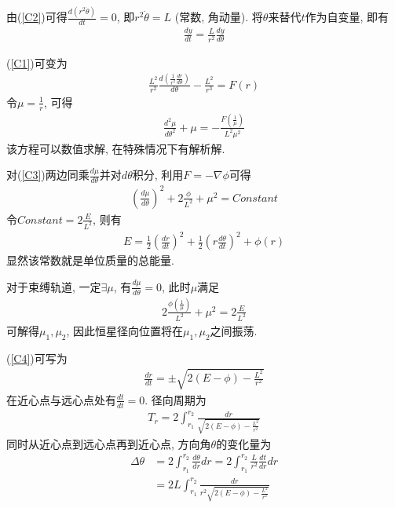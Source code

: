由(\ref{C2})可得$\displaystyle \frac{d(r^2\dot{\theta})}{dt}=0$, 即$r^2\dot{\theta}=L$ (常数, 角动量). 将$\theta$来替代$t$作为自变量, 即有
\begin{align*}
    \frac{dy}{dt}=\frac{L}{r^2}\frac{dy}{d\theta}
\end{align*}

(\ref{C1})可变为
\begin{align*}
    \frac{L^2}{r^2}\frac{d\left( \frac{1}{r^2}\frac{dr}{d\theta} \right)}{d\theta}-\frac{L^2}{r^3}=F(r)
\end{align*}
令$\mu=\frac{1}{r}$, 可得
\begin{align}
    \frac{d^2\mu}{d\theta^2}+\mu =-\frac{F(\frac{1}{\mu})}{L^2\mu^2} \label{C3}
\end{align}
该方程可以数值求解, 在特殊情况下有解析解. 

对(\ref{C3})两边同乘$\frac{d\mu}{d\theta}$并对$d\theta$积分, 利用$F=-\nabla \phi$可得
\begin{align*}
    \left( \frac{d\mu}{d\theta} \right)^2+2\frac{\phi}{L^2}+\mu^2=Constant
\end{align*}
令$Constant=2\frac{E}{L^2}$, 则有
\begin{align}
    E=\frac{1}{2}\left( \frac{dr}{dt} \right)^2+\frac{1}{2}\left( r\frac{d\theta}{dt} \right)^2+\phi(r) \label{C4}
\end{align}
显然该常数就是单位质量的总能量. 

对于束缚轨道, 一定$\exists \mu$, 有$\frac{d\mu}{d\theta}=0$, 此时$\mu$满足
\begin{align*}
    2\frac{\phi(\frac{1}{\mu})}{L^2}+\mu^2=2\frac{E}{L^2}
\end{align*}
可解得$\mu_1, \mu_2$, 因此恒星径向位置将在$\mu_1, \mu_2$之间振荡. 

(\ref{C4})可写为
\begin{align*}
    \frac{dr}{dt}=\pm\sqrt{2(E-\phi)-\frac{L^2}{r^2}}
\end{align*}
在近心点与远心点处有$\frac{dt}{dt}=0$. 径向周期为
\begin{align*}
    T_r=2\int_{r_1}^{r_2}\frac{dr}{\sqrt{2(E-\phi)-\frac{L^2}{r^2}}}
\end{align*}
同时从近心点到远心点再到近心点, 方向角$\theta$的变化量为
\begin{align*}
    \Delta \theta&=2\int_{r_1}^{r_2}\frac{d\theta}{dr}dr=2\int_{r_1}^{r_2}\frac{L}{r^2}\frac{dt}{dr}dr\\
    &=2L\int_{r_1}^{r_2}\frac{dr}{r^2\sqrt{2(E-\phi)-\frac{L^2}{r^2}}}
\end{align*}

